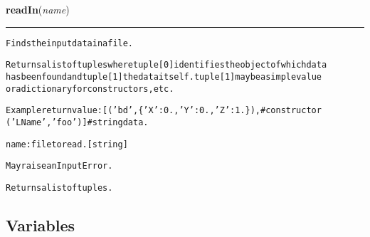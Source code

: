     \label{theia:running:parser:readIn}

    \vspace{0.5ex}

\hspace{.8\funcindent}\begin{boxedminipage}{\funcwidth}

    \raggedright \textbf{readIn}(\textit{name})

    \vspace{-1.5ex}

    \rule{\textwidth}{0.5\fboxrule}
\setlength{\parskip}{2ex}
\begin{alltt}
Finds the input data in a file.

Returns a list of tuples where tuple[0] identifies the object of which data
has been found and tuple[1] the data itself. tuple[1] may be a simple value
or a dictionary for constructors, etc.

Example return value: [ ('bd', \{'X': 0., 'Y': 0., 'Z': 1.\}),    \#constructor
                        ('LName', 'foo')]   \#string data.

name: file to read. [string]

May raise an InputError.

Returns a list of tuples.
\end{alltt}

\setlength{\parskip}{1ex}
    \end{boxedminipage}



  \subsection{Variables}

